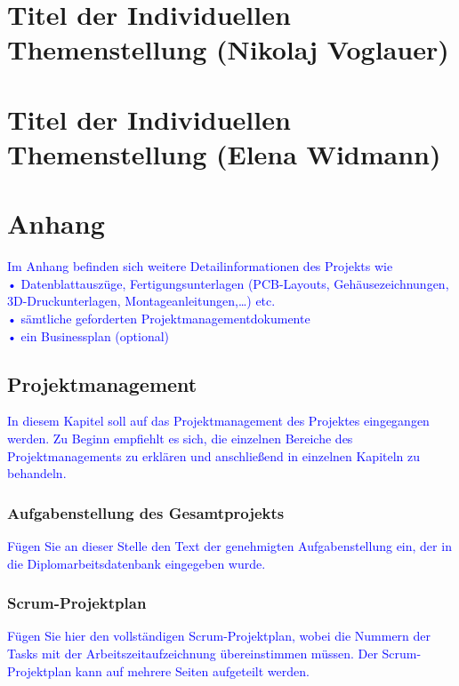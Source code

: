 \documentclass[12pt]{article}
\begin{document}
\section{Titel der Individuellen Themenstellung (Nikolaj Voglauer)}

\newpage
\section{Titel der Individuellen Themenstellung (Elena Widmann)}

\newpage
\section{Anhang}
\textcolor{blue}{Im Anhang befinden sich weitere Detailinformationen des Projekts wie\\
•	Datenblattauszüge, Fertigungsunterlagen (PCB-Layouts, Gehäusezeichnungen, 3D-Druckunterlagen, Montageanleitungen,…) etc.\\
•	sämtliche geforderten Projektmanagementdokumente\\
•	ein Businessplan (optional)
}

\subsection{Projektmanagement}
\textcolor{blue}{In diesem Kapitel soll auf das Projektmanagement des Projektes eingegangen werden. Zu Beginn empfiehlt es sich, die einzelnen Bereiche des Projektmanagements zu erklären und anschließend in einzelnen Kapiteln zu behandeln.}

\subsubsection{Aufgabenstellung des Gesamtprojekts}
\textcolor{blue}{Fügen Sie an dieser Stelle den Text der genehmigten Aufgabenstellung ein, der in die Diplomarbeitsdatenbank  eingegeben wurde.}

\subsubsection{Scrum-Projektplan}
\textcolor{blue}{Fügen Sie hier den vollständigen Scrum-Projektplan, wobei die Nummern der Tasks mit der Arbeitszeitaufzeichnung übereinstimmen müssen. Der Scrum-Projektplan kann auf mehrere Seiten aufgeteilt werden.}
\end{document}
